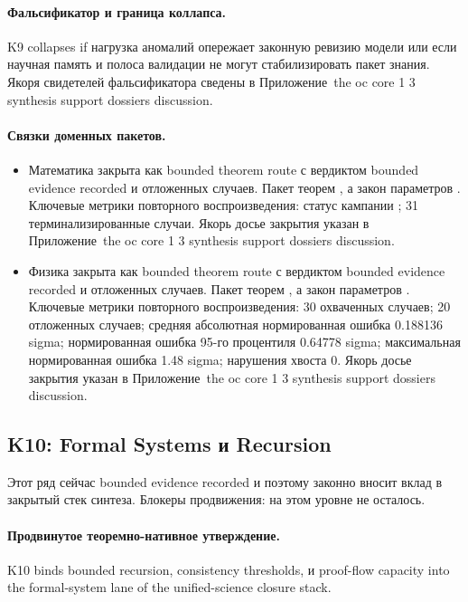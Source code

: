 \paragraph{Фальсификатор и граница коллапса.}
K9 collapses if нагрузка аномалий опережает законную ревизию модели или если научная память и полоса валидации не могут стабилизировать пакет знания.
Якоря свидетелей фальсификатора сведены в Приложение~the oc core 1 3 synthesis support dossiers discussion.

\paragraph{Связки доменных пакетов.}
\begin{itemize}[leftmargin=1.6em,nosep]
\item Математика закрыта как bounded theorem route с вердиктом bounded evidence recorded и  отложенных случаев. Пакет теорем , а закон параметров . Ключевые метрики повторного воспроизведения: статус кампании ; 31 терминализированные случаи. Якорь досье закрытия указан в Приложение~the oc core 1 3 synthesis support dossiers discussion.
\item Физика закрыта как bounded theorem route с вердиктом bounded evidence recorded и  отложенных случаев. Пакет теорем , а закон параметров . Ключевые метрики повторного воспроизведения: 30 охваченных случаев; 20 отложенных случаев; средняя абсолютная нормированная ошибка 0.188136 sigma; нормированная ошибка 95-го процентиля 0.64778 sigma; максимальная нормированная ошибка 1.48 sigma; нарушения хвоста 0. Якорь досье закрытия указан в Приложение~the oc core 1 3 synthesis support dossiers discussion.
\end{itemize}

\subsection{K10: Formal Systems и Recursion}
\label{sec:oc-core-1-3-synthesis-k10}
Этот ряд сейчас bounded evidence recorded и поэтому законно вносит вклад в закрытый стек синтеза.
Блокеры продвижения: на этом уровне не осталось.

\paragraph{Продвинутое теоремно-нативное утверждение.}
K10 binds bounded recursion, consistency thresholds, и proof-flow capacity into the formal-system lane of the unified-science closure stack.


